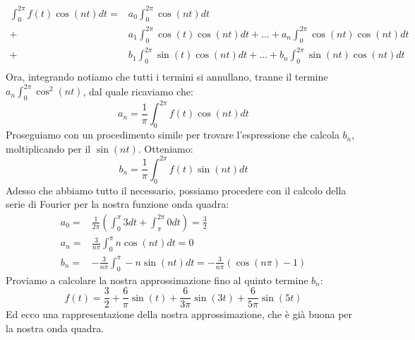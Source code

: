 \documentclass[a4paper, titlepage, oneside]{scrbook}
\begin{document}
\begin{align*}
\int_{0}^{2\pi}f(t)\cos(nt)dt=&a_0\int_{0}^{2\pi}\cos(nt)dt\\
							 +&a_1\int_{0}^{2\pi}\cos(t)\cos(nt)dt+\dots+a_n\int_{0}^{2\pi}\cos(nt)\cos(nt)dt\\
							 +&b_1\int_{0}^{2\pi}\sin(t)\cos(nt)dt+\dots+b_n\int_{0}^{2\pi}\sin(nt)\cos(nt)dt\\
\end{align*}
Ora, integrando notiamo che tutti i termini si annullano, tranne il termine $a_n\int_{0}^{2\pi}\cos^2(nt)$, dal quale ricaviamo che:
\begin{equation*}
	a_n=\frac{1}{\pi}\int_{0}^{2\pi}f(t)\cos(nt)dt
\end{equation*}
Proseguiamo con un procedimento simile per trovare l'espressione che calcola $b_n$, moltiplicando per il $\sin(nt)$. Otteniamo:
\begin{equation*}
	b_n=\frac{1}{\pi}\int_{0}^{2\pi}f(t)\sin(nt)dt
\end{equation*}
Adesso che abbiamo tutto il necessario, possiamo procedere con il calcolo della serie di Fourier per la nostra funzione onda quadra:
\begin{align*}
	a_0=&\frac{1}{2\pi}\left(\int_{0}^{\pi}3dt+\int_{\pi}^{2\pi}0dt\right)=\frac{3}{2}\\
	a_n=&\frac{3}{n\pi}\int_{0}^{\pi}n\cos(nt)dt=0\\
	b_n=&-\frac{3}{n\pi}\int_{0}^{\pi}-n\sin(nt)dt=-\frac{3}{n\pi}(\cos(n\pi)-1)
\end{align*}
Proviamo a calcolare la nostra approssimazione fino al quinto termine $b_n$:
\begin{equation*}
	f(t)=\frac{3}{2}+\frac{6}{\pi}\sin(t)+\frac{6}{3\pi}\sin(3t)+\frac{6}{5\pi}\sin(5t)
\end{equation*}
Ed ecco una rappresentazione della nostra approssimazione, che è già buona per la nostra onda quadra.
\begin{figure}[h]
	\centering
\end{figure}
\end{document}
